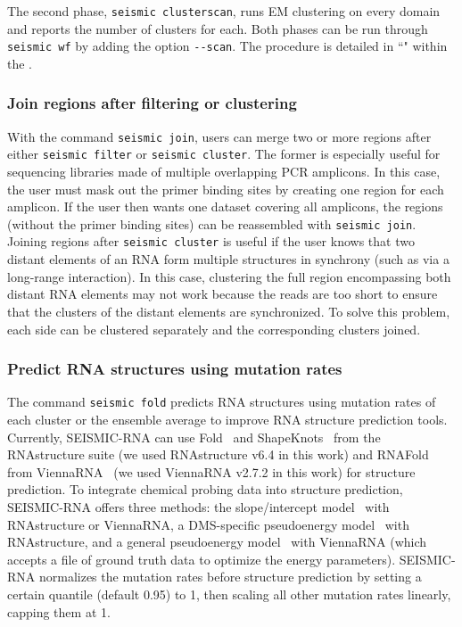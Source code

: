 \documentclass[unnumsec,webpdf,contemporary,large]{oup-authoring-template}%
\theoremstyle{thmstyleone}%
\theoremstyle{thmstyletwo}%
\theoremstyle{thmstylethree}%
\begin{document}
The second phase, \verb|seismic clusterscan|, runs EM clustering on every domain and reports the number of clusters for each.
Both phases can be run through \verb|seismic wf| by adding the option \verb|--scan|.
The procedure is detailed in ``" within the .

\subsubsection{Join regions after filtering or clustering}
\label{seismic-join}

With the command \verb|seismic join|, users can merge two or more regions after either \verb|seismic filter| or \verb|seismic cluster|.
The former is especially useful for sequencing libraries made of multiple overlapping PCR amplicons.
In this case, the user must mask out the primer binding sites by creating one region for each amplicon.
If the user then wants one dataset covering all amplicons, the regions (without the primer binding sites) can be reassembled with \verb|seismic join|.
Joining regions after \verb|seismic cluster| is useful if the user knows that two distant elements of an RNA form multiple structures in synchrony (such as via a long-range interaction).
In this case, clustering the full region encompassing both distant RNA elements may not work because the reads are too short to ensure that the clusters of the distant elements are synchronized.
To solve this problem, each side can be clustered separately and the corresponding clusters joined.

\subsubsection{Predict RNA structures using mutation rates}
\label{seismic-fold}

The command \verb|seismic fold| predicts RNA structures using mutation rates of each cluster or the ensemble average to improve RNA structure prediction tools.
Currently, SEISMIC-RNA can use Fold~\cite{Reuter2010} and ShapeKnots~\cite{Hajdin2013} from the RNAstructure suite (we used RNAstructure v6.4 in this work) and RNAFold from ViennaRNA~\cite{Lorenz2011} (we used ViennaRNA v2.7.2 in this work) for structure prediction.
To integrate chemical probing data into structure prediction, SEISMIC-RNA offers three methods: the slope/intercept model~\cite{Deigan2009} with RNAstructure or ViennaRNA, a DMS-specific pseudoenergy model~\cite{Cordero2012} with RNAstructure, and a general pseudoenergy model~\cite{Eddy2014} with ViennaRNA (which accepts a file of ground truth data to optimize the energy parameters).
SEISMIC-RNA normalizes the mutation rates before structure prediction by setting a certain quantile (default 0.95) to 1, then scaling all other mutation rates linearly, capping them at 1.
\end{document}
